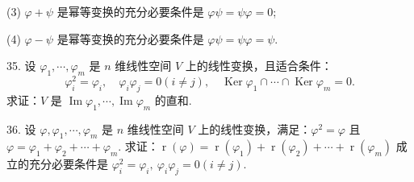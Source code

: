 \documentclass[UTF8,12pt,a4paper,fontset=fandol]{ctexart}
\begin{document}
(3) $\varphi+\psi$ 是幂等变换的充分必要条件是 $\varphi\psi=\psi\varphi=0$;

(4) $\varphi-\psi$ 是幂等变换的充分必要条件是 $\varphi\psi=\psi\varphi=\psi$.

35. 设 $\varphi_1,\cdots,\varphi_m$ 是 $n$ 维线性空间 $V$ 上的线性变换，且适合条件：
\[
\varphi_i^2=\varphi_i,\quad \varphi_i\varphi_j=0(i\neq j),\quad \operatorname{Ker}\varphi_1\cap\cdots\cap\operatorname{Ker}\varphi_m=0.
\]
求证：$V$ 是 $\operatorname{Im}\varphi_1,\cdots,\operatorname{Im}\varphi_m$ 的直和.

36. 设 $\varphi,\varphi_1,\cdots,\varphi_m$ 是 $n$ 维线性空间 $V$ 上的线性变换，满足：$\varphi^2=\varphi$ 且 $\varphi=\varphi_1+\varphi_2+\cdots+\varphi_m$. 求证：$\operatorname{r}(\varphi)=\operatorname{r}(\varphi_1)+\operatorname{r}(\varphi_2)+\cdots+\operatorname{r}(\varphi_m)$ 成立的充分必要条件是 $\varphi_i^2=\varphi_i,\ \varphi_i\varphi_j=0(i\neq j)$.
\end{document}
